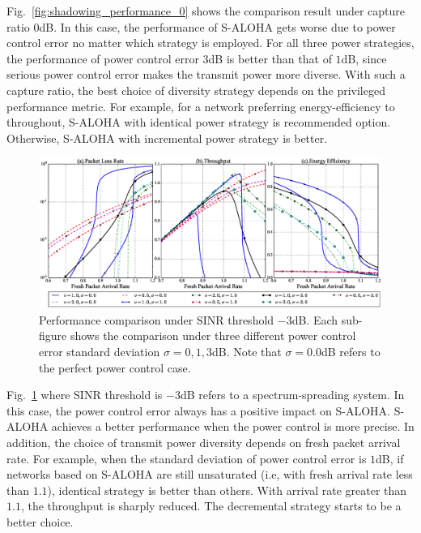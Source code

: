 Fig.~\ref{fig:shadowing_performance_0} shows the comparison result under capture ratio $0$dB. In this case, the performance of S-ALOHA gets worse due to power control error no matter which strategy is employed. For all three power strategies, the performance of power control error $3$dB is better than that of $1$dB, since serious power control error makes the transmit power more diverse. With such a capture ratio, the best choice of diversity strategy depends on the privileged performance metric. For example, for a network preferring energy-efficiency to throughout, S-ALOHA with identical power strategy is recommended option. Otherwise, S-ALOHA with incremental power strategy is better. 

\begin{figure}[!th]
	\centering
	\includegraphics[width=1.0\linewidth]{Chapter4/Figures/shadowing_performance_case_-3.0.eps}
	\caption{Performance comparison under SINR threshold $-3$dB. Each sub-figure shows the comparison under three different power control error standard deviation $\sigma = 0, 1, 3$dB. Note that $\sigma=0.0$dB refers to the perfect power control case.}
	\label{fig:shadowing_performance_-3}
\end{figure}
Fig.~\ref{fig:shadowing_performance_-3} where SINR threshold is $-3$dB refers to a spectrum-spreading system. In this case, the power control error always has a positive impact on S-ALOHA. S-ALOHA achieves a better performance when the power control is more precise. In addition, the choice of transmit power diversity depends on fresh packet arrival rate. For example, when the standard deviation of power control error is $1$dB, if networks based on S-ALOHA are still unsaturated (i.e, with fresh arrival rate less than $1.1$), identical strategy is better than others. With arrival rate greater than $1.1$, the throughput  is sharply reduced. The decremental strategy starts to be a better choice.
 


